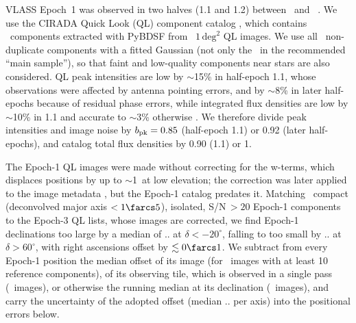 \documentclass[linenumbers]{aastex702}
\makeatletter
\newcommand{\asec}[1]{\expandafter\asec@i#1..\@nil}
\def\asec@i#1.#2.#3\@nil{\ifx\relax#2\relax#1\arcsec\else#1\farcs#2\fi}
\makeatother
\begin{document}
VLASS Epoch~1 was observed in two halves (1.1 and 1.2) between \EpochMin\ and \EpochMax\ \citep{Lacy2020,Kimball2026}. We use the CIRADA Quick Look (QL) component catalog \citep{Gordon2020,Gordon2021}, which contains \NComp\ components extracted with PyBDSF \citep{Mohan2015} from \NSubtiles\ $1\,\mathrm{deg}^2$ QL images. We use all \NUsedComp\ non-duplicate components with a fitted Gaussian (not only the \NMainSample\ in the recommended ``main sample''), so that faint and low-quality components near stars are also considered. QL peak intensities are low by $\sim$15\% in half-epoch 1.1, whose observations were affected by antenna pointing errors, and by $\sim$8\% in later half-epochs because of residual phase errors, while integrated flux densities are low by $\sim$10\% in 1.1 and accurate to $\sim$3\% otherwise \citep{Kimball2026}. We therefore divide peak intensities and image noise by $b_{\rm pk}=0.85$ (half-epoch 1.1) or 0.92 (later half-epochs), and catalog total flux densities by 0.90 (1.1) or 1.

The Epoch-1 QL images were made without correcting for the w-terms, which displaces positions by up to $\sim$1\arcsec\ at low elevation; the correction was later applied to the image metadata \citep{Kimball2026}, but the Epoch-1 catalog predates it. Matching \EOnePairs\ compact (deconvolved major axis $<1\farcs5$), isolated, S/N\,$>20$ Epoch-1 components to the Epoch-3 QL lists, whose images are corrected, we find Epoch-1 declinations too large by a median of \asec{\EOneDNsouth} at $\delta<-20^\circ$, falling to too small by \asec{\EOneDNnorth} at $\delta>60^\circ$, with right ascensions offset by $\lesssim0\farcs1$. We subtract from every Epoch-1 position the median offset of its image (for \EOneNsub\ images with at least 10 reference components), of its observing tile, which is observed in a single pass (\EOneNtile\ images), or otherwise the running median at its declination (\EOneNdec\ images), and carry the uncertainty of the adopted offset (median \asec{\EcorrMed} per axis) into the positional errors below.
\end{document}
